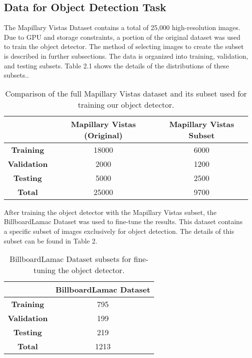 \subsection{Data for Object Detection Task}\label{sec:datadetection}

The Mapillary Vistas Dataset contains a total of 25,000 high-resolution images. Due to GPU and storage constraints, a portion of the original dataset was used to train the object detector. The method of selecting images to create the subset is described in further subsections. The data is organized into training, validation, and testing subsets. Table 2.1 shows the details of the distributions of these subsets..\\

\begin{table}[h!]
\centering
\renewcommand{\arraystretch}{1.3} %
\begin{tabular}{|c|c|c|}
\hline
\textbf{} & \textbf{Mapillary Vistas (Original)} & \textbf{Mapillary Vistas Subset} \\ \hline
\textbf{Training}    & 18000  & 6000  \\ \hline
\textbf{Validation}  & 2000   & 1200  \\ \hline
\textbf{Testing}     & 5000   & 2500  \\ \hline
\textbf{Total}       & 25000  & 9700  \\ \hline
\end{tabular}
\caption{Comparison of the full Mapillary Vistas dataset and its subset used for training our object detector.}
\label{tab:mapillarydata}
\end{table}

After training the object detector with the Mapillary Vistas subset, the BillboardLamac Dataset was used to fine-tune the results. This dataset contains a specific subset of images exclusively for object detection. The details of this subset can be found in Table 2.\\

\begin{table}[h!]
\centering
\renewcommand{\arraystretch}{1.3} %
\begin{tabular}{|c|c|}
\hline
\textbf{} & \textbf{BillboardLamac Dataset} \\ \hline
\textbf{Training}    & 795 \\ \hline
\textbf{Validation}  & 199  \\ \hline
\textbf{Testing}     & 219  \\ \hline
\textbf{Total}       & 1213 \\ \hline
\end{tabular}
\caption{BillboardLamac Dataset subsets for fine-tuning the object detector.}
\label{tab:lamacdata}
\end{table}